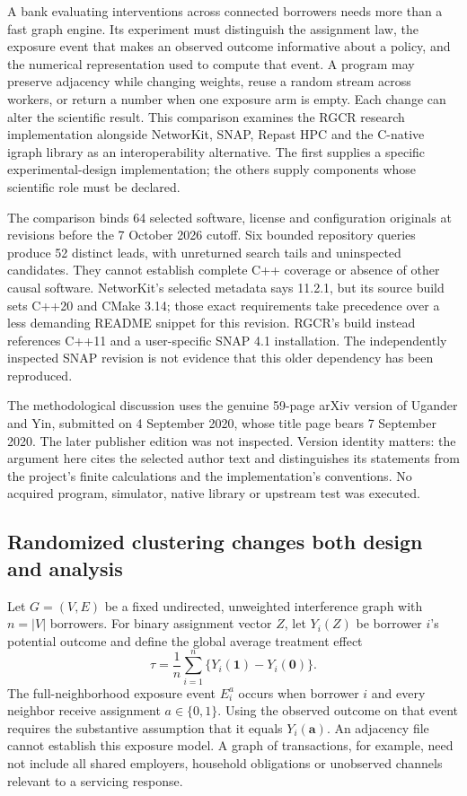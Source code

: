 A bank evaluating interventions across connected borrowers needs more than a fast graph engine. Its experiment must distinguish the assignment law, the exposure event that makes an observed outcome informative about a policy, and the numerical representation used to compute that event. A program may preserve adjacency while changing weights, reuse a random stream across workers, or return a number when one exposure arm is empty. Each change can alter the scientific result. This comparison examines the RGCR research implementation alongside NetworKit, SNAP, Repast HPC and the C-native igraph library as an interoperability alternative. The first supplies a specific experimental-design implementation; the others supply components whose scientific role must be declared.~\citep{exec25_cnet_rgcr,exec25_cnet_networkit,exec25_cnet_snap,exec25_cnet_repast,exec25_cnet_igraph}

The comparison binds 64 selected software, license and configuration originals at revisions before the 7 October 2026 cutoff. Six bounded repository queries produce 52 distinct leads, with unreturned search tails and uninspected candidates. They cannot establish complete C++ coverage or absence of other causal software. NetworKit's selected metadata says 11.2.1, but its source build sets C++20 and CMake 3.14; those exact requirements take precedence over a less demanding README snippet for this revision. RGCR's build instead references C++11 and a user-specific SNAP 4.1 installation. The independently inspected SNAP revision is not evidence that this older dependency has been reproduced.~\citep{exec25_cnet_choice,exec25_cnet_networkit,exec25_cnet_rgcr}

The methodological discussion uses the genuine 59-page arXiv version of Ugander and Yin, submitted on 4 September 2020, whose title page bears 7 September 2020. The later publisher edition was not inspected. Version identity matters: the argument here cites the selected author text and distinguishes its statements from the project's finite calculations and the implementation's conventions. No acquired program, simulator, native library or upstream test was executed.~\citep{exec25_cnet_paper,exec25_cnet_choice}

\subsection{Randomized clustering changes both design and analysis}

Let $G=(V,E)$ be a fixed undirected, unweighted interference graph with $n=|V|$ borrowers. For binary assignment vector $Z$, let $Y_i(Z)$ be borrower $i$'s potential outcome and define the global average treatment effect
\[
 \tau=\frac{1}{n}\sum_{i=1}^n\{Y_i(\mathbf{1})-Y_i(\mathbf{0})\}.
\]
The full-neighborhood exposure event $E_i^a$ occurs when borrower $i$ and every neighbor receive assignment $a\in\{0,1\}$. Using the observed outcome on that event requires the substantive assumption that it equals $Y_i(\mathbf{a})$. An adjacency file cannot establish this exposure model. A graph of transactions, for example, need not include all shared employers, household obligations or unobserved channels relevant to a servicing response.~\citep{exec25_cnet_paper,exec25_cnet_choice}

